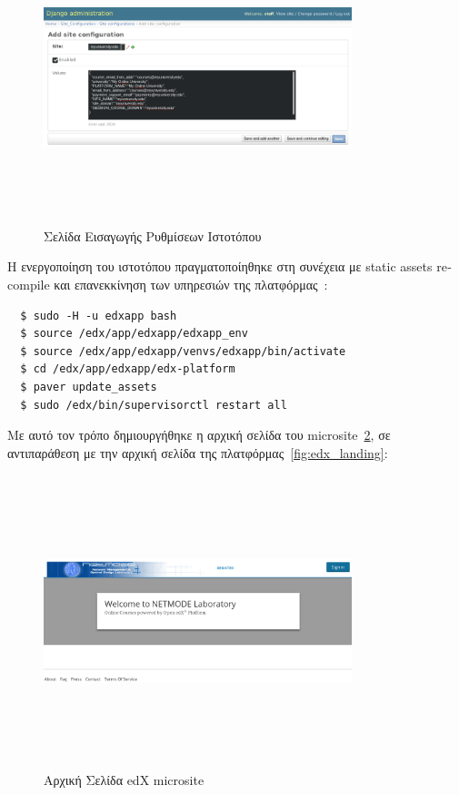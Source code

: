 \documentclass[12pt]{report}
\begin{document}
\begin{figure}[!htbp]
\centering
\includegraphics[width=0.8\textwidth, height=8.5cm]{django-site-conf}
\caption{Σελίδα Εισαγωγής Ρυθμίσεων Ιστοτόπου}
\label{fig:django-site-conf}
\end{figure}

Η ενεργοποίηση του ιστοτόπου πραγματοποίηθηκε στη συνέχεια με \textlatin{static assets recompile} και επανεκκίνηση των υπηρεσιών της πλατφόρμας~\cite{lawrence_mcdaniel_2018}:
\begin{lstlisting}
  $ sudo -H -u edxapp bash
  $ source /edx/app/edxapp/edxapp_env
  $ source /edx/app/edxapp/venvs/edxapp/bin/activate
  $ cd /edx/app/edxapp/edx-platform
  $ paver update_assets
  $ sudo /edx/bin/supervisorctl restart all
\end{lstlisting}
Με αυτό τον τρόπο δημιουργήθηκε η αρχική σελίδα του \textlatin{microsite}~\ref{fig:microsite_landing}, σε αντιπαράθεση με την αρχική σελίδα της πλατφόρμας~\ref{fig:edx_landing}:
\begin{figure}[!htbp]
\centering
\includegraphics[width=0.8\textwidth, height=8.5cm]{microsite-landing}
\caption{Αρχική Σελίδα \textlatin{edX microsite}}
\label{fig:microsite_landing}
\end{figure}
\end{document}
